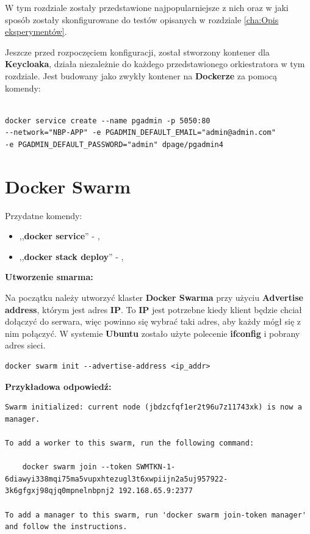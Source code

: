 \documentclass{iiuwb}
\begin{document}
W tym rozdziale zostały przedstawione najpopularniejsze 
z nich oraz w jaki sposób zostały skonfigurowane do 
testów opisanych w rozdziale \ref{cha:Opis eksperymentów}.

Jeszcze przed rozpoczęciem konfiguracji, został stworzony 
kontener dla \textbf{Keycloaka}, działa niezależnie do każdego
przedstawionego orkiestratora w tym rozdziale. Jest budowany 
jako zwykły kontener na \textbf{Dockerze} za pomocą komendy:


\begin{lstlisting}[breaklines=true]

docker service create --name pgadmin -p 5050:80 
--network="NBP-APP" -e PGADMIN_DEFAULT_EMAIL="admin@admin.com" 
-e PGADMIN_DEFAULT_PASSWORD="admin" dpage/pgadmin4 

\end{lstlisting}

\section{Docker Swarm}
\label{sec:Docker Swarm}

Przydatne komendy:

\begin{itemize}
\item ,,\textbf{docker service}'' - , 
\item ,,\textbf{docker stack deploy}'' - , 
\end{itemize}


\textbf{Utworzenie smarma:}

Na początku należy utworzyć klaster \textbf{Docker Swarma} przy użyciu \textbf{Advertise address}, którym
jest adres \textbf{IP}. To \textbf{IP} jest potrzebne kiedy klient będzie chciał dołączyć do serwara, więc powinno
się wybrać taki adres, aby każdy mógł się z nim połączyć. W systemie \textbf{Ubuntu} zostało użyte polecenie 
\textbf{ifconfig} i pobrany adres sieci.

\begin{lstlisting}[breaklines=true]
docker swarm init --advertise-address <ip_addr>
\end{lstlisting}

\textbf{Przykładowa odpowiedź:}

\begin{lstlisting}[breaklines=true]
Swarm initialized: current node (jbdzcfqf1er2t96u7z11743xk) is now a manager.

To add a worker to this swarm, run the following command:

    docker swarm join --token SWMTKN-1-6diawyi338mqi75ma5vupxhtezugl3t6xwpiijn2a5uj957922-3k6gfgxj98qjq0mpnelnbpnj2 192.168.65.9:2377

To add a manager to this swarm, run 'docker swarm join-token manager' and follow the instructions.
\end{lstlisting}
\end{document}
